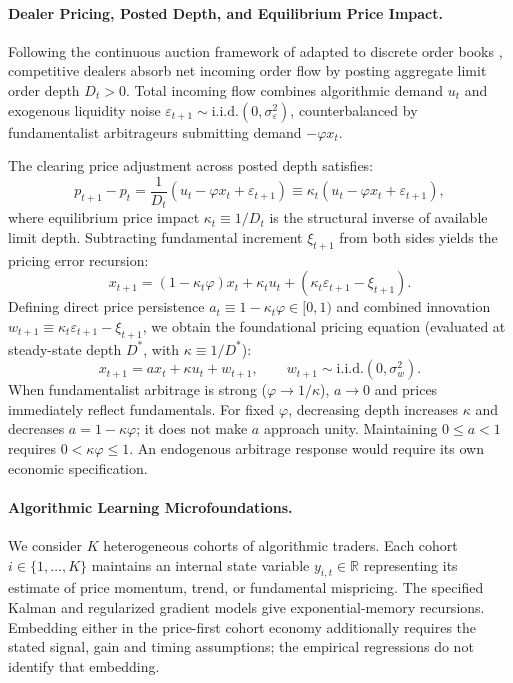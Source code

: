 \documentclass[12pt]{article}
\theoremstyle{definition}
\theoremstyle{remark}
\newcommand{\R}{\mathbb{R}}
\begin{document}
\paragraph{Dealer Pricing, Posted Depth, and Equilibrium Price Impact.}
Following the continuous auction framework of \citet{kyle1985continuous} adapted to discrete order books \citep{glosten1985bid,hasbrouck1991,bouchaud2004fluctuations}, competitive dealers absorb net incoming order flow by posting aggregate limit order depth $D_t > 0$. Total incoming flow combines algorithmic demand $u_t$ and exogenous liquidity noise $\varepsilon_{t+1} \sim \text{i.i.d.}(0, \sigma_\varepsilon^2)$, counterbalanced by fundamentalist arbitrageurs submitting demand $-\varphi x_t$.

The clearing price adjustment across posted depth satisfies:
\begin{equation}
p_{t+1} - p_t = \frac{1}{D_t} \left( u_t - \varphi x_t + \varepsilon_{t+1} \right) \equiv \kappa_t \left( u_t - \varphi x_t + \varepsilon_{t+1} \right),
\end{equation}
where equilibrium price impact $\kappa_t \equiv 1/D_t$ is the structural inverse of available limit depth. Subtracting fundamental increment $\xi_{t+1}$ from both sides yields the pricing error recursion:
\begin{equation}
x_{t+1} = (1 - \kappa_t \varphi) x_t + \kappa_t u_t + \left( \kappa_t \varepsilon_{t+1} - \xi_{t+1} \right).
\end{equation}
Defining direct price persistence $a_t \equiv 1 - \kappa_t \varphi \in [0, 1)$ and combined innovation $w_{t+1} \equiv \kappa_t \varepsilon_{t+1} - \xi_{t+1}$, we obtain the foundational pricing equation (evaluated at steady-state depth $D^*$, with $\kappa \equiv 1/D^*$):
\begin{equation}
x_{t+1} = a x_t + \kappa u_t + w_{t+1}, \qquad w_{t+1} \sim \text{i.i.d.}(0, \sigma_w^2).
\label{eq:micro_pricing}
\end{equation}
When fundamentalist arbitrage is strong ($\varphi \to 1/\kappa$), $a \to 0$ and prices immediately reflect fundamentals. For fixed $\varphi$, decreasing depth increases $\kappa$ and decreases $a=1-\kappa\varphi$; it does not make $a$ approach unity. Maintaining $0\le a<1$ requires $0<\kappa\varphi\le1$. An endogenous arbitrage response would require its own economic specification.

\paragraph{Algorithmic Learning Microfoundations.}
We consider $K$ heterogeneous cohorts of algorithmic traders. Each cohort $i \in \{1, \dots, K\}$ maintains an internal state variable $y_{i,t} \in \R$ representing its estimate of price momentum, trend, or fundamental mispricing. The specified Kalman and regularized gradient models give exponential-memory recursions. Embedding either in the price-first cohort economy additionally requires the stated signal, gain and timing assumptions; the empirical regressions do not identify that embedding.
\end{document}
